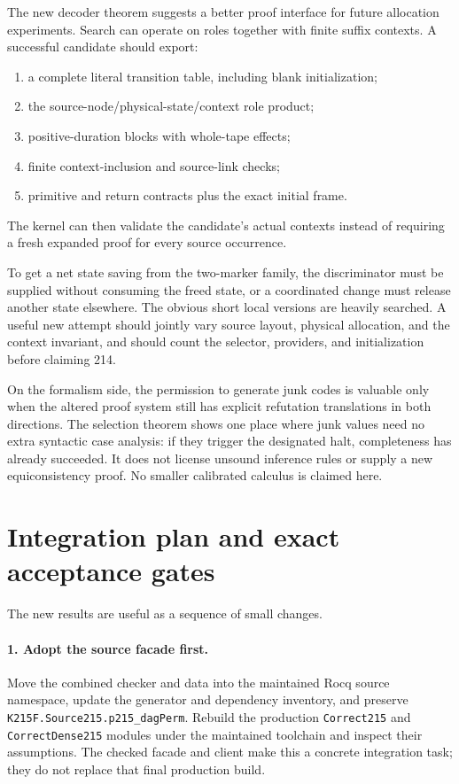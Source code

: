 \documentclass[11pt]{article}
\newcommand{\code}[1]{\texttt{#1}}
\theoremstyle{remark}
\begin{document}
The new decoder theorem suggests a better proof interface for future
allocation experiments. Search can operate on roles together with finite
suffix contexts. A successful candidate should export:
\begin{enumerate}
\item a complete literal transition table, including blank initialization;
\item the source-node/physical-state/context role product;
\item positive-duration blocks with whole-tape effects;
\item finite context-inclusion and source-link checks;
\item primitive and return contracts plus the exact initial frame.
\end{enumerate}
The kernel can then validate the candidate's actual contexts instead of
requiring a fresh expanded proof for every source occurrence.

To get a net state saving from the two-marker family, the discriminator
must be supplied without consuming the freed state, or a coordinated
change must release another state elsewhere. The obvious short local
versions are heavily searched. A useful new attempt should jointly vary
source layout, physical allocation, and the context invariant, and should
count the selector, providers, and initialization before claiming 214.

On the formalism side, the permission to generate junk codes is valuable
only when the altered proof system still has explicit refutation
translations in both directions. The selection theorem shows one place
where junk values need no extra syntactic case analysis: if they trigger
the designated halt, completeness has already succeeded. It does not
license unsound inference rules or supply a new equiconsistency proof.
No smaller calibrated calculus is claimed here.

\section{Integration plan and exact acceptance gates}

The new results are useful as a sequence of small changes.

\paragraph{1. Adopt the source facade first.}
Move the combined checker and data into the maintained Rocq source
namespace, update the generator and dependency inventory, and preserve
\code{K215F.Source215.p215\_dagPerm}. Rebuild the production
\code{Correct215} and \code{CorrectDense215} modules under the maintained
toolchain and inspect their assumptions. The checked facade and client
make this a concrete integration task; they do not replace that final
production build.
\end{document}
